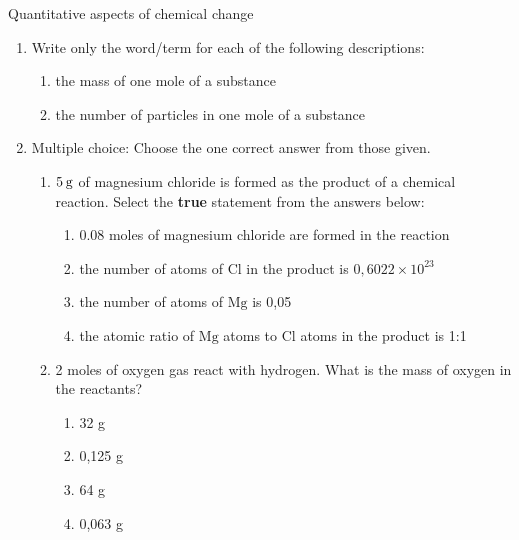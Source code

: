             \begin{eocexercises}{Quantitative aspects of chemical change}
            \nopagebreak \noindent
      \label{m38712*id286171}\begin{enumerate}[noitemsep, label=\textbf{\arabic*}. ] 
            \label{m38712*uid123}\item Write only the word/term for each of the following descriptions:
\label{m38712*id286187}\begin{enumerate}[noitemsep, label=\textbf{\alph*}. ] 
            \label{m38712*uid124}\item the mass of one mole of a substance
\label{m38712*uid125}\item the number of particles in one mole of a substance
\end{enumerate}
                \label{m38712*uid126}\item Multiple choice: Choose the one correct answer from those given.
\label{m38712*id286228}\begin{enumerate}[noitemsep, label=\textbf{\alph*}. ] 
            \label{m38712*uid127}\item $5\phantom{\rule{2pt}{0ex}}\text{g}$ of magnesium chloride is formed as the product of a chemical reaction. Select the \textbf{true} statement from the answers below:
\label{m38712*id286251}\begin{enumerate}[noitemsep, label=\textbf{\roman*}. ] 
            \label{m38712*uid128}\item 0.08 moles of magnesium chloride are formed in the reaction
\label{m38712*uid129}\item the number of atoms of $\text{Cl}$ in the product is $0,6022\ensuremath{\times}{10}^{23}$\label{m38712*uid130}\item the number of atoms of $\text{Mg}$ is 0,05
\label{m38712*uid131}\item the atomic ratio of $\text{Mg}$ atoms to $\text{Cl}$ atoms in the product is 1:1
\end{enumerate}
                \label{m38712*uid132}\item 2 moles of oxygen gas react with hydrogen. What is the mass of oxygen in the reactants?
\label{m38712*id286339}\begin{enumerate}[noitemsep, label=\textbf{\roman*}. ] 
            \label{m38712*uid133}\item 32 g
\label{m38712*uid134}\item 0,125 g
\label{m38712*uid135}\item 64 g
\label{m38712*uid136}\item 0,063 g

\end{enumerate}
\end{enumerate}
\end{enumerate}
\end{eocexercises}
